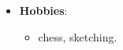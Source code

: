 \begin{itemize}
	\item \textbf{Hobbies}: \hfill \\[-0.6cm]
	\begin{itemize}
		\item chess, sketching.   
	\end{itemize}
\end{itemize}
